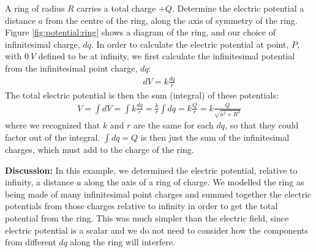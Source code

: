 \begin{example}{\label{ex:potential:ring}A ring of radius $R$ carries a total charge $+Q$. Determine the electric potential a distance $a$ from the centre of the ring, along the axis of symmetry of the ring.}
Figure \ref{fig:potential:ring} shows a diagram of the ring, and our choice of infinitesimal charge, $dq$. 
In order to calculate the electric potential at point, $P$, with $\SI{0}{V}$ defined to be at infinity, we first calculate the infinitesimal potential from the infinitesimal point charge, $dq$:
\begin{align*}
dV=k\frac{dq}{r}
\end{align*}
The total electric potential is then the sum (integral) of these potentials:
\begin{align*}
V=\int dV=\int k\frac{dq}{r} = \frac{k}{r}\int dq=k\frac{Q}{r}=k\frac{Q}{\sqrt{a^2+R^2}}
\end{align*}
where we recognized that $k$ and $r$ are the same for each $dq$, so that they could factor out of the integral. $\int dq=Q$ is then just the sum of the infinitesimal charges, which must add to the charge of the ring.

\textbf{Discussion:} In this example, we determined the electric potential, relative to infinity, a distance $a$ along the axis of a ring of charge. We modelled the ring as being made of many infinitesimal point charges and summed together the electric potentials from those charges relative to infinity in order to get the total potential from the ring. This was much simpler than the electric field, since electric potential is a scalar and we do not need to consider how the components from different $dq$ along the ring will interfere.
\end{example}

